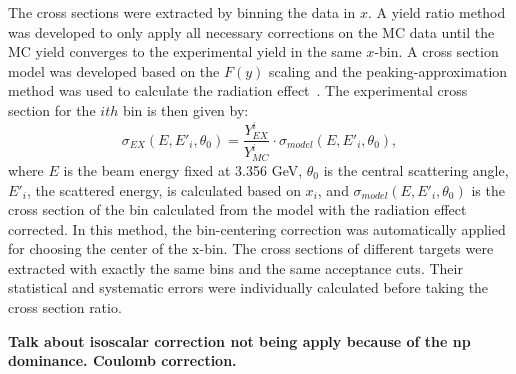 The cross sections were extracted by binning the data in $x$. A yield ratio method was developed to only apply all necessary corrections on the MC data until the MC yield converges to the experimental yield in the same $x$-bin.
A cross section model was developed based on the $F(y)$ scaling and the peaking-approximation method was used to calculate the radiation
effect~\cite{zye_thesis}. The experimental cross section for the $ith$ bin is then given by:
	\begin{equation}
	\sigma_{EX}(E, E'_{i},\theta_{0}) = \frac{Y^{i}_{EX}}{Y^{i}_{MC}}\cdot\sigma_{model}(E, E'_{i},\theta_{0}),
	\end{equation}
where $E$ is the beam energy fixed at 3.356 GeV, $\theta_{0}$ is the central scattering angle, $E'_{i}$, the scattered energy, is calculated based on $x_{i}$, and $\sigma_{model}(E, E'_{i},\theta_{0})$ is the cross section of the bin calculated from the model with the radiation effect corrected.  In this method, the bin-centering correction was automatically applied for choosing the center of the x-bin. The cross sections of different targets were extracted with exactly the same bins and the same acceptance cuts. Their statistical and systematic errors were individually calculated before taking the cross section ratio.

{\bf Talk about isoscalar correction not being apply because of the np dominance. Coulomb correction.}
